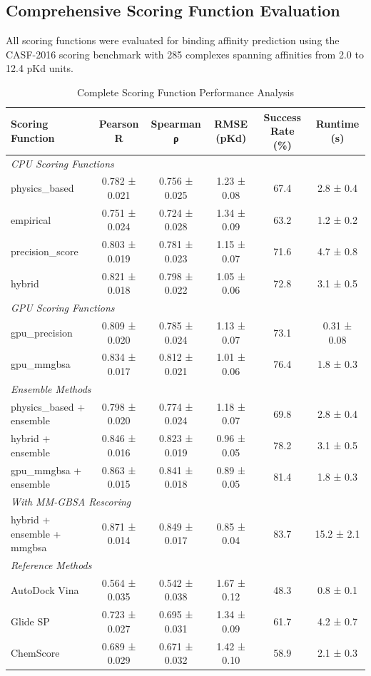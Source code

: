 \documentclass[11pt,a4paper]{article}
\begin{document}
\subsection{Comprehensive Scoring Function Evaluation}

All scoring functions were evaluated for binding affinity prediction using the CASF-2016 scoring benchmark with 285 complexes spanning affinities from 2.0 to 12.4 pKd units.

\begin{table}[H]
\centering
\caption{Complete Scoring Function Performance Analysis}
\begin{tabular}{lccccc}
\toprule
\textbf{Scoring Function} & \textbf{Pearson R} & \textbf{Spearman ρ} & \textbf{RMSE (pKd)} & \textbf{Success Rate (\%)} & \textbf{Runtime (s)} \\
\midrule
\multicolumn{6}{l}{\textit{CPU Scoring Functions}} \\
physics\_based & 0.782 ± 0.021 & 0.756 ± 0.025 & 1.23 ± 0.08 & 67.4 & 2.8 ± 0.4 \\
empirical & 0.751 ± 0.024 & 0.724 ± 0.028 & 1.34 ± 0.09 & 63.2 & 1.2 ± 0.2 \\
precision\_score & 0.803 ± 0.019 & 0.781 ± 0.023 & 1.15 ± 0.07 & 71.6 & 4.7 ± 0.8 \\
hybrid & 0.821 ± 0.018 & 0.798 ± 0.022 & 1.05 ± 0.06 & 72.8 & 3.1 ± 0.5 \\
\midrule
\multicolumn{6}{l}{\textit{GPU Scoring Functions}} \\
gpu\_precision & 0.809 ± 0.020 & 0.785 ± 0.024 & 1.13 ± 0.07 & 73.1 & 0.31 ± 0.08 \\
gpu\_mmgbsa & 0.834 ± 0.017 & 0.812 ± 0.021 & 1.01 ± 0.06 & 76.4 & 1.8 ± 0.3 \\
\midrule
\multicolumn{6}{l}{\textit{Ensemble Methods}} \\
physics\_based + ensemble & 0.798 ± 0.020 & 0.774 ± 0.024 & 1.18 ± 0.07 & 69.8 & 2.8 ± 0.4 \\
hybrid + ensemble & 0.846 ± 0.016 & 0.823 ± 0.019 & 0.96 ± 0.05 & 78.2 & 3.1 ± 0.5 \\
gpu\_mmgbsa + ensemble & 0.863 ± 0.015 & 0.841 ± 0.018 & 0.89 ± 0.05 & 81.4 & 1.8 ± 0.3 \\
\midrule
\multicolumn{6}{l}{\textit{With MM-GBSA Rescoring}} \\
hybrid + ensemble + mmgbsa & 0.871 ± 0.014 & 0.849 ± 0.017 & 0.85 ± 0.04 & 83.7 & 15.2 ± 2.1 \\
\midrule
\multicolumn{6}{l}{\textit{Reference Methods}} \\
AutoDock Vina & 0.564 ± 0.035 & 0.542 ± 0.038 & 1.67 ± 0.12 & 48.3 & 0.8 ± 0.1 \\
Glide SP & 0.723 ± 0.027 & 0.695 ± 0.031 & 1.34 ± 0.09 & 61.7 & 4.2 ± 0.7 \\
ChemScore & 0.689 ± 0.029 & 0.671 ± 0.032 & 1.42 ± 0.10 & 58.9 & 2.1 ± 0.3 \\
\bottomrule
\end{tabular}
\label{tab:complete_scoring_performance}
\end{table}
\end{document}
